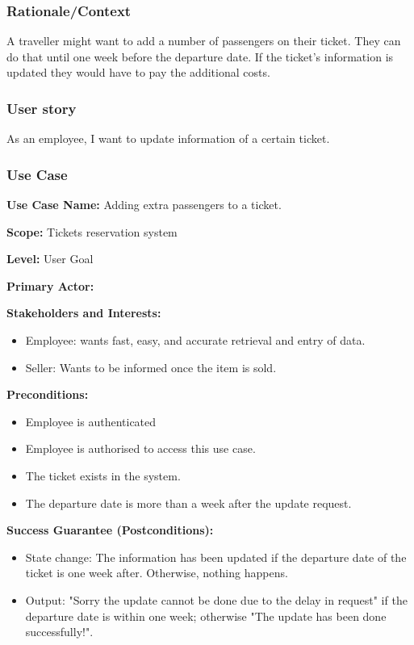 \subsubsection{Rationale/Context}
A traveller might want to add a number of passengers on their ticket. They can do that until one week before the departure date. If the ticket's information is updated they would have to pay the additional costs.
\subsubsection{User story}
As an employee, I want to update information of a certain ticket.
\subsubsection{Use Case}
\creator{\studentB}


\textbf{Use Case Name:} Adding extra passengers to a ticket.

\textbf{Scope:} Tickets reservation system

\textbf{Level:} User Goal

\textbf{Primary Actor:} 

\textbf{Stakeholders and Interests:} 
\begin{itemize}
\item Employee: wants fast, easy, and accurate retrieval and entry of data.
\item Seller: Wants to be informed once the item is sold.
\end{itemize}
\textbf{Preconditions:} 
\begin{itemize}
\item Employee is authenticated
\item Employee is authorised to access this use case.
\item The ticket exists in the system.
\item The departure date is more than a week after the update request.
\end{itemize}

\textbf{Success Guarantee (Postconditions):} 
\begin{itemize}
\item State change: The information has been updated if the departure date of the ticket is one week after. Otherwise, nothing happens. 
\item Output: "Sorry the update cannot be done due to the delay in request" if the departure date is within one week; otherwise "The update has been done successfully!".
\end{itemize}

